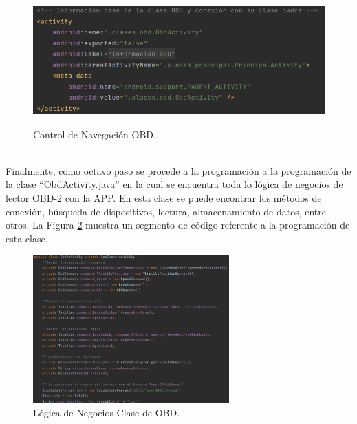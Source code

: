 \documentclass[a4paper,10pt, oneside, titlepage]{article}
\begin{document}
	\begin{figure}[!h]
		\centering
		\includegraphics[width = 1\linewidth, height = 5cm]{Navegacion_OBD_Manifest.png}
		\caption{Control de Navegación OBD.}
		\label{Navegacion_OBD_Manifest}
	\end{figure} \\
	\indent Finalmente, como octavo paso se procede a la programación a la programación de la clase ``ObdActivity.java'' en la cual se encuentra toda lo lógica de negocios de lector OBD-2 con la APP. En esta clase se puede encontrar los métodos de conexión, búsqueda de dispositivos, lectura, almacenamiento de datos, entre otros. La Figura \ref{Logica_Negocios_OBD} muestra un segmento de código referente a la programación de esta clase.
	\begin{figure}[!h]
		\centering
		\includegraphics[width = 1\linewidth, height = 5.7cm]{Logica_Negocios_OBD.png}
		\caption{Lógica de Negocios Clase de OBD.}
		\label{Logica_Negocios_OBD}
	\end{figure}
\end{document}
